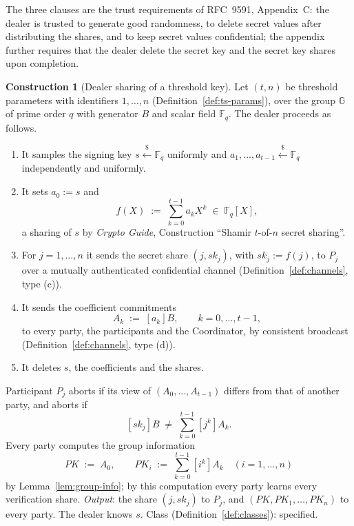 \documentclass[11pt,a4paper]{article}
\theoremstyle{definition}
\newtheorem{construction}[theorem]{Construction}
\newcommand{\F}{\mathbb{F}}
\newcommand{\G}{\mathbb{G}}
\newcommand{\Fq}{\F_q}
\begin{document}
The three clauses are the trust requirements of RFC~9591, Appendix~C: the
dealer is trusted to generate good randomness, to delete secret values after
distributing the shares, and to keep secret values confidential; the
appendix further requires that the dealer delete the secret key and the
secret key shares upon completion.

\begin{construction}[Dealer sharing of a threshold key]\label{def:dealer}
Let \((t, n)\) be threshold parameters with identifiers \(1, \dots, n\)
(Definition~\ref{def:ts-params}), over the group \(\G\) of prime order \(q\)
with generator \(B\) and scalar field \(\Fq\). The dealer proceeds as
follows.
\begin{enumerate}
\item It samples the signing key \(s \xleftarrow{\$} \Fq\) uniformly and
  \(a_1, \dots, a_{t-1} \xleftarrow{\$} \Fq\) independently and uniformly.
\item It sets \(a_0 := s\) and
  \[
    f(X) \;:=\; \sum_{k=0}^{t-1} a_k X^k \;\in\; \Fq[X] ,
  \]
  a sharing of \(s\) by \emph{Crypto Guide}, Construction ``Shamir
  \(t\)-of-\(n\) secret sharing''.
\item For \(j = 1, \dots, n\) it sends the secret share
  \((j, \mathit{sk}_j)\), with \(\mathit{sk}_j := f(j)\), to \(P_j\) over a
  mutually authenticated confidential channel
  (Definition~\ref{def:channels}, type (c)).
\item It sends the coefficient commitments
  \[
    A_k \;:=\; [a_k]B , \qquad k = 0, \dots, t - 1 ,
  \]
  to every party, the participants and the Coordinator, by consistent
  broadcast (Definition~\ref{def:channels}, type (d)).
\item It deletes \(s\), the coefficients and the shares.
\end{enumerate}
Participant \(P_j\) aborts if its view of \((A_0, \dots, A_{t-1})\) differs
from that of another party, and aborts if
\[
  [\mathit{sk}_j]B \;\ne\; \sum_{k=0}^{t-1} [j^k] A_k .
\]
Every party computes the group information
\[
  \mathit{PK} \;:=\; A_0 , \qquad
  \mathit{PK}_i \;:=\; \sum_{k=0}^{t-1} [i^k] A_k
  \quad (i = 1, \dots, n)
\]
by Lemma~\ref{lem:group-info}; by this computation every party learns every
verification share. \emph{Output}: the share \((j, \mathit{sk}_j)\) to
\(P_j\), and \((\mathit{PK}, \mathit{PK}_1, \dots, \mathit{PK}_n)\) to every
party. The dealer knows \(s\). Class (Definition~\ref{def:classes}):
specified.
\end{construction}
\end{document}
